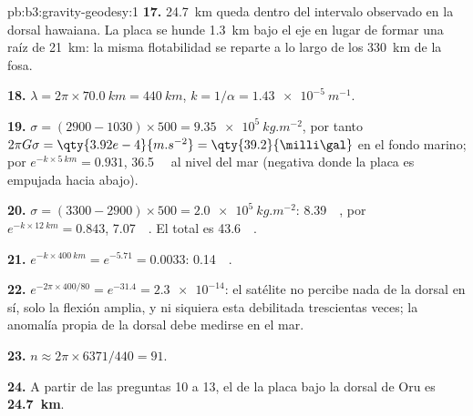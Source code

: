 \begin{solution}{pb:b3:gravity-geodesy:1}
\textbf{17.} \qty{24.7}{km} queda dentro del intervalo observado en la dorsal hawaiana. La
placa se hunde \qty{1.3}{km} bajo el eje en lugar de formar una raíz de
\qty{21}{km}: la misma flotabilidad se reparte a lo largo de los \qty{330}{km} de la fosa.

\textbf{18.} $\lambda = 2\pi\times\qty{70.0}{km} = \qty{440}{km}$,
$k = 1/\alpha = \qty{1.43e-5}{m^{-1}}$.

\textbf{19.} $\sigma = (2900 - 1030)\times500 = \qty{9.35e5}{kg.m^{-2}}$, por tanto
$2\pi G\sigma = \qty{3.92e-4}{m.s^{-2}} = \qty{39.2}{\milli\gal}$ en el fondo marino;
por $e^{-k\times\qty{5}{km}} = 0.931$, \qty{36.5}{\milli\gal} al nivel del mar
(negativa donde la placa es empujada hacia abajo).

\textbf{20.} $\sigma = (3300 - 2900)\times500 = \qty{2.0e5}{kg.m^{-2}}$:
\qty{8.39}{\milli\gal}, por $e^{-k\times\qty{12}{km}} = 0.843$,
\qty{7.07}{\milli\gal}. El total es \qty{43.6}{\milli\gal}.

\textbf{21.} $e^{-k\times\qty{400}{km}} = e^{-5.71} = 0.0033$: \qty{0.14}{\milli\gal}.

\textbf{22.} $e^{-2\pi\times400/80} = e^{-31.4} = \num{2.3e-14}$: el satélite
no percibe nada de la dorsal en sí, solo la flexión amplia, y ni siquiera esta
debilitada trescientas veces; la anomalía propia de la dorsal debe medirse en el mar.

\textbf{23.} $n \approx 2\pi\times6371/440 = 91$.

\textbf{24.} A partir de las preguntas 10 a 13, el  de la
placa bajo la dorsal de Oru es
\textbf{\qty[text-series-to-math=true]{24.7}{km}}.
\end{solution}
